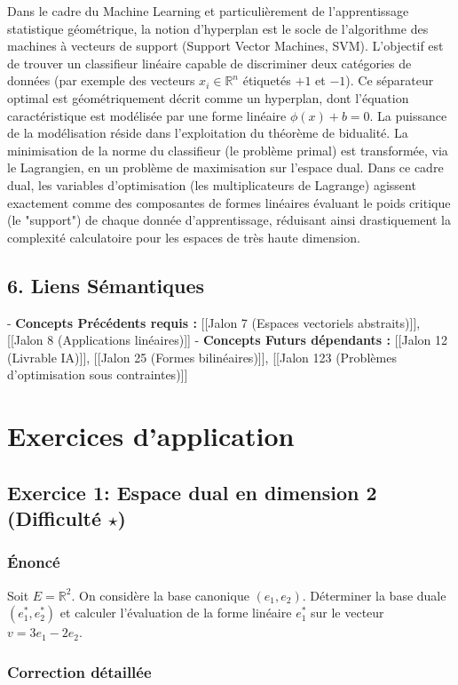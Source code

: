 \documentclass[11pt,a4paper]{report}
\begin{document}
Dans le cadre du Machine Learning et particulièrement de l'apprentissage statistique géométrique, la notion d'hyperplan est le socle de l'algorithme des machines à vecteurs de support (Support Vector Machines, SVM). L'objectif est de trouver un classifieur linéaire capable de discriminer deux catégories de données (par exemple des vecteurs $x_i \in \mathbb{R}^n$ étiquetés $+1$ et $-1$). Ce séparateur optimal est géométriquement décrit comme un hyperplan, dont l'équation caractéristique est modélisée par une forme linéaire $\phi(x) + b = 0$.
La puissance de la modélisation réside dans l'exploitation du théorème de bidualité. La minimisation de la norme du classifieur (le problème primal) est transformée, via le Lagrangien, en un problème de maximisation sur l'espace dual. Dans ce cadre dual, les variables d'optimisation (les multiplicateurs de Lagrange) agissent exactement comme des composantes de formes linéaires évaluant le poids critique (le "support") de chaque donnée d'apprentissage, réduisant ainsi drastiquement la complexité calculatoire pour les espaces de très haute dimension.

\section{6. Liens Sémantiques}
- \textbf{Concepts Précédents requis :} [[Jalon 7 (Espaces vectoriels abstraits)]], [[Jalon 8 (Applications linéaires)]]
- \textbf{Concepts Futurs dépendants :} [[Jalon 12 (Livrable IA)]], [[Jalon 25 (Formes bilinéaires)]], [[Jalon 123 (Problèmes d'optimisation sous contraintes)]]

\chapter{Exercices d'application}
\section{Exercice 1: Espace dual en dimension 2 (Difficulté $\star$)}

\subsection{Énoncé}
Soit $E = \mathbb{R}^2$. On considère la base canonique $(e_1, e_2)$. Déterminer la base duale $(e_1^*, e_2^*)$ et calculer l'évaluation de la forme linéaire $e_1^*$ sur le vecteur $v = 3e_1 - 2e_2$.

\subsection{Correction détaillée}
\end{document}

